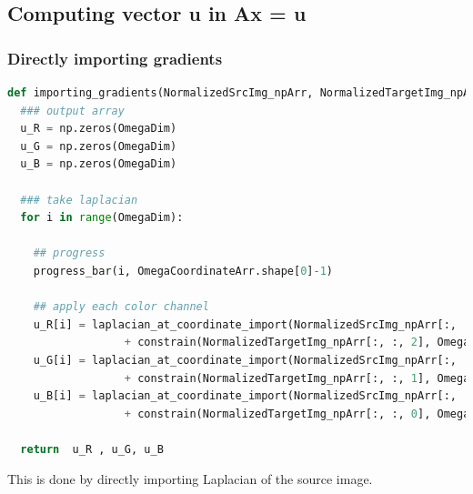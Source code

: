 \documentclass[10pt, a4paper]{article}%
\begin{document}
 \subsection{Computing vector u in Ax = u}
 \subsubsection{Directly importing gradients}
 \begin{lstlisting}[language=python]
def importing_gradients(NormalizedSrcImg_npArr, NormalizedTargetImg_npArr, OmegaCoordinateArr, Outline, Neighborhood_existence, OmegaDim):
  ### output array
  u_R = np.zeros(OmegaDim)
  u_G = np.zeros(OmegaDim)
  u_B = np.zeros(OmegaDim)

  ### take laplacian
  for i in range(OmegaDim):

    ## progress
    progress_bar(i, OmegaCoordinateArr.shape[0]-1)

    ## apply each color channel
    u_R[i] = laplacian_at_coordinate_import(NormalizedSrcImg_npArr[:, :, 2], OmegaCoordinateArr[i], Neighborhood_existence[i]) \
                  + constrain(NormalizedTargetImg_npArr[:, :, 2], OmegaCoordinateArr[i], Outline, Neighborhood_existence[i])
    u_G[i] = laplacian_at_coordinate_import(NormalizedSrcImg_npArr[:, :, 1], OmegaCoordinateArr[i], Neighborhood_existence[i]) \
                  + constrain(NormalizedTargetImg_npArr[:, :, 1], OmegaCoordinateArr[i], Outline, Neighborhood_existence[i])
    u_B[i] = laplacian_at_coordinate_import(NormalizedSrcImg_npArr[:, :, 0], OmegaCoordinateArr[i], Neighborhood_existence[i]) \
                  + constrain(NormalizedTargetImg_npArr[:, :, 0], OmegaCoordinateArr[i], Outline, Neighborhood_existence[i])

  return  u_R , u_G, u_B
 \end{lstlisting}
 This is done by directly importing Laplacian of the source image.
\end{document}
